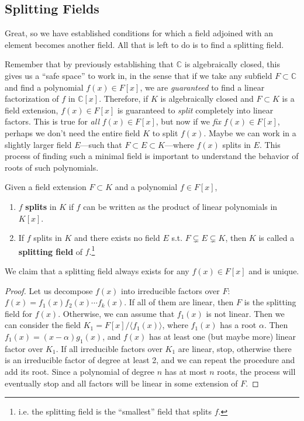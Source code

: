\subsection{Splitting Fields} 

  Great, so we have established conditions for which a field adjoined with an element becomes another field. All that is left to do is to find a splitting field.

  Remember that by previously establishing that $\mathbb{C}$ is algebraically closed, this gives us a ``safe space'' to work in, in the sense that if we take any subfield $F \subset \mathbb{C}$ and find a polynomial $f(x) \in F[x]$, we are \textit{guaranteed} to find a linear factorization of $f$ in $\mathbb{C}[x]$. Therefore, if $K$ is algebraically closed and $F \subset K$ is a field extension, $f(x) \in F[x]$ is guaranteed to \textit{split} completely into linear factors. This is true for \textit{all} $f(x) \in F[x]$, but now if we \textit{fix} $f(x) \in F[x]$, perhaps we don't need the entire field $K$ to split $f(x)$. Maybe we can work in a slightly larger field $E$---such that $F \subset E \subset K$---where $f(x)$ splits in $E$. This process of finding such a minimal field is important to understand the behavior of roots of such polynomials. 

  \begin{definition}
    Given a field extension $F \subset K$ and a polynomial $f \in F[x]$, 
    \begin{enumerate}
      \item $f$ \textbf{splits} in $K$ if $f$ can be written as the product of linear polynomials in $K[x]$. 
      \item If $f$ splits in $K$ and there exists no field $E$ s.t. $F \subsetneq E \subsetneq K$, then $K$ is called a \textbf{splitting field} of $f$.\footnote{i.e. the splitting field is the ``smallest'' field that splits $f$.} 
    \end{enumerate}
    We claim that a splitting field always exists for any $f(x) \in F[x]$ and is unique. 
  \end{definition}
  \begin{proof}
    Let us decompose $f(x)$ into irreducible factors over $F$: $f(x) = f_1(x)f_2(x)\cdots f_k(x)$. If all of them are linear, then $F$ is the splitting field for $f(x)$. Otherwise, we can assume that $f_1(x)$ is not linear. Then we can consider the field $K_1 = F[x]/\langle f_1(x) \rangle$, where $f_1(x)$ has a root $\alpha$. Then $f_1(x) = (x - \alpha)g_1(x)$, and $f(x)$ has at least one (but maybe more) linear factor over $K_1$. If all irreducible factors over $K_1$ are linear, stop, otherwise there is an irreducible factor of degree at least 2, and we can repeat the procedure and add its root. Since a polynomial of degree $n$ has at most $n$ roots, the process will eventually stop and all factors will be linear in some extension of $F$.
  \end{proof} 

